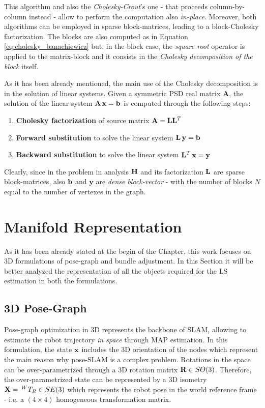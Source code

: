 This algorithm and also the \textit{Cholesky-Crout}'s one - that proceeds column-by-column instead - allow to perform the computation also \textit{in-place}. Moreover, both algorithms can be employed in sparse block-matrices, leading to a block-Cholesky factorization. The blocks are also computed as in Equation \ref{eq:cholesky_banachiewicz} but, in the block case, the \textit{square root} operator is applied to the matrix-block and it consists in the \textit{Cholesky decomposition of the block} itself.

As it has been already mentioned, the main use of the Cholesky decomposition is in the solution of linear systems. Given a symmetric PSD real matrix $\mathbf{A}$, the solution of the linear system $\mathbf{A}\,\mathbf{x} = \mathbf{b}$ is computed through the following steps:

\begin{enumerate}
    \item \textbf{Cholesky factorization} of source matrix $\mathbf{A} = \mathbf{L} \mathbf{L}^T$
    \item \textbf{Forward substitution} to solve the linear system $\mathbf{L} \, \mathbf{y} = \mathbf{b}$
    \item \textbf{Backward substitution} to solve the linear system $\mathbf{L}^T\, \mathbf{x} = \mathbf{y}$
\end{enumerate}

Clearly, since in the problem in analysis $\mathbf{H}$ and its factorization $\mathbf{L}$ are sparse block-matrices, also $\mathbf{b}$ and $\mathbf{y}$ are \textit{dense block-vector} - with the number of blocks $N$ equal to the number of vertexes in the graph.

\section{Manifold Representation}\label{sec:manifold_se3}
As it has been already stated at the begin of the Chapter, this work focuses on 3D formulations of pose-graph and bundle adjustment. In this Section it will be better analyzed the representation of all the objects required for the LS estimation in both the formulations.

\subsection{3D Pose-Graph}\label{subsec:3d_pose_graphs}
Pose-graph optimization in 3D represents the backbone of SLAM, allowing to estimate the robot trajectory \textit{in space} through MAP estimation. In this formulation, the state $\mathbf{x}$ includes the 3D orientation of the nodes which represent the main reason why pose-SLAM is a complex problem. Rotations in the space can be over-parametrized through a 3D rotation matrix $\mathbf{R} \in SO(3)$. Therefore, the over-parametrized state can be represented by a 3D isometry $\mathbf{X} = \,^{W}T_{R} \in SE(3)$ which represents the robot pose in the world reference frame - i.e. a $(4 \times 4)$ homogeneous transformation matrix.

